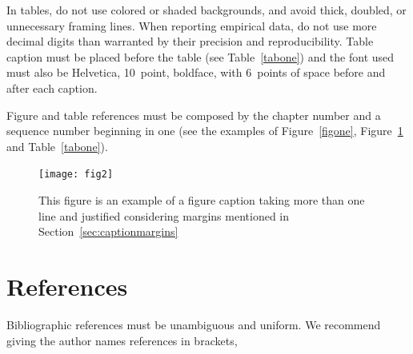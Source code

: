 \documentclass{SBCbookchapter}
\begin{document}
In tables, do not use colored or shaded backgrounds, and avoid thick,
doubled, or unnecessary framing lines. When reporting empirical data,
do not use more decimal digits than warranted by their precision and
reproducibility. Table caption must be placed before the table (see
Table~\ref{tabone}) and the font used must also be Helvetica,
10~point, boldface, with 6~points of space before and after each
caption.

Figure and table references must be composed by the chapter number and
a sequence number beginning in one (see the examples of
Figure~\ref{figone}, Figure~\ref{figtwo} and Table~\ref{tabone}).

\begin{figure}[h!]
	\centerline{\texttt{[image: fig2]}}
	\caption{This figure is an example of a figure caption taking
		more than one line and justified considering margins
		mentioned in Section~\ref{sec:captionmargins}}
	\label{figtwo}
\end{figure}



\section{References}
Bibliographic references must be unambiguous and uniform.  We
recommend giving the author names references in brackets,


\end{document}
